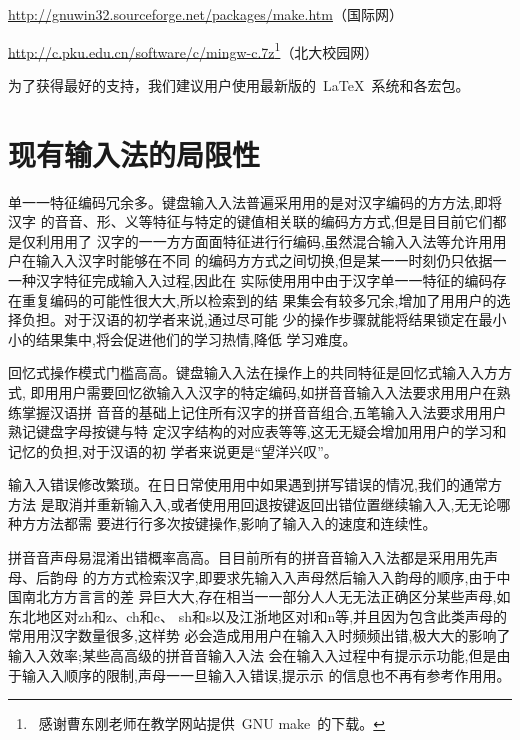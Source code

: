 	\url{http://gnuwin32.sourceforge.net/packages/make.htm}（国际网）
	\vspace{-0.1em}\par
	\url{http://c.pku.edu.cn/software/c/mingw-c.7z}\footnote%
	{\ 感谢曹东刚老师在教学网站提供~GNU make~的下载。}（北大校园网）

	为了获得最好的支持，我们建议用户使用最新版的~\LaTeX{}~系统和各宏包。

	\section{现有输入法的局限性}

	单⼀一特征编码冗余多。键盘输⼊入法普遍采⽤用的是对汉字编码的⽅方法,即将汉字 的⾳音、形、义等特征与特定的键值相关联的编码⽅方式,但是⽬目前它们都是仅利⽤用了 汉字的⼀一⽅方⾯面特征进⾏行编码,虽然混合输⼊入法等允许⽤用户在输⼊入汉字时能够在不同 的编码⽅方式之间切换,但是某⼀一时刻仍只依据⼀一种汉字特征完成输⼊入过程,因此在 实际使⽤用中由于汉字单⼀一特征的编码存在重复编码的可能性很⼤大,所以检索到的结 果集会有较多冗余,增加了⽤用户的选择负担。对于汉语的初学者来说,通过尽可能 少的操作步骤就能将结果锁定在最⼩小的结果集中,将会促进他们的学习热情,降低 学习难度。

	回忆式操作模式门槛⾼高。键盘输⼊入法在操作上的共同特征是回忆式输⼊入⽅方式, 即⽤用户需要回忆欲输⼊入汉字的特定编码,如拼⾳音输⼊入法要求⽤用户在熟练掌握汉语拼 ⾳音的基础上记住所有汉字的拼⾳音组合,五笔输⼊入法要求⽤用户熟记键盘字母按键与特 定汉字结构的对应表等等,这⽆无疑会增加⽤用户的学习和记忆的负担,对于汉语的初 学者来说更是“望洋兴叹”。

	输⼊入错误修改繁琐。在⽇日常使⽤用中如果遇到拼写错误的情况,我们的通常⽅方法 是取消并重新输⼊入,或者使⽤用回退按键返回出错位置继续输⼊入,⽆无论哪种⽅方法都需 要进⾏行多次按键操作,影响了输⼊入的速度和连续性。

	拼⾳音声母易混淆出错概率⾼高。⽬目前所有的拼⾳音输⼊入法都是采⽤用先声母、后韵母 的⽅方式检索汉字,即要求先输⼊入声母然后输⼊入韵母的顺序,由于中国南北⽅方⾔言的差 异巨⼤大,存在相当⼀一部分⼈人⽆无法正确区分某些声母,如东北地区对zh和z、ch和c、 sh和s以及江浙地区对l和n等,并且因为包含此类声母的常⽤用汉字数量很多,这样势 必会造成⽤用户在输⼊入时频频出错,极⼤大的影响了输⼊入效率;某些⾼高级的拼⾳音输⼊入法 会在输⼊入过程中有提⽰示功能,但是由于输⼊入顺序的限制,声母⼀一旦输⼊入错误,提⽰示 的信息也不再有参考作⽤用。

